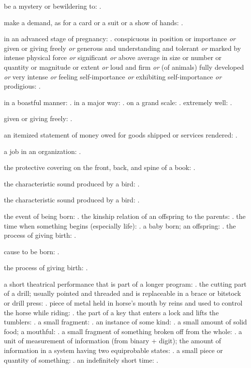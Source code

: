   be a mystery or bewildering to: .

  make a demand, as for a card or a suit or a show of hands: .

  in an advanced stage of pregnancy: . conspicuous in position or importance \textit{or} given or giving freely \textit{or} generous and understanding and tolerant \textit{or} marked by intense physical force \textit{or} significant \textit{or} above average in size or number or quantity or magnitude or extent \textit{or} loud and firm \textit{or} (of animals) fully developed \textit{or} very intense \textit{or} feeling self-importance \textit{or} exhibiting self-importance \textit{or} prodigious: .

  in a boastful manner: . in a major way: . on a grand scale: . extremely well: .

  given or giving freely: .

  an itemized statement of money owed for goods shipped or services rendered: .

  a job in an organization: .

  the protective covering on the front, back, and spine of a book: .

  the characteristic sound produced by a bird: .

  the characteristic sound produced by a bird: .

  the event of being born: . the kinship relation of an offspring to the parents: . the time when something begins (especially life): . a baby born; an offspring: . the process of giving birth: .

  cause to be born: .

  the process of giving birth: .

  a short theatrical performance that is part of a longer program: . the cutting part of a drill; usually pointed and threaded and is replaceable in a brace or bitstock or drill press: . piece of metal held in horse's mouth by reins and used to control the horse while riding: . the part of a key that enters a lock and lifts the tumblers: . a small fragment: . an instance of some kind: . a small amount of solid food; a mouthful: \vocab{}. a small fragment of something broken off from the whole: . a unit of measurement of information (from binary + digit); the amount of information in a system having two equiprobable states: . a small piece or quantity of something: . an indefinitely short time: .

